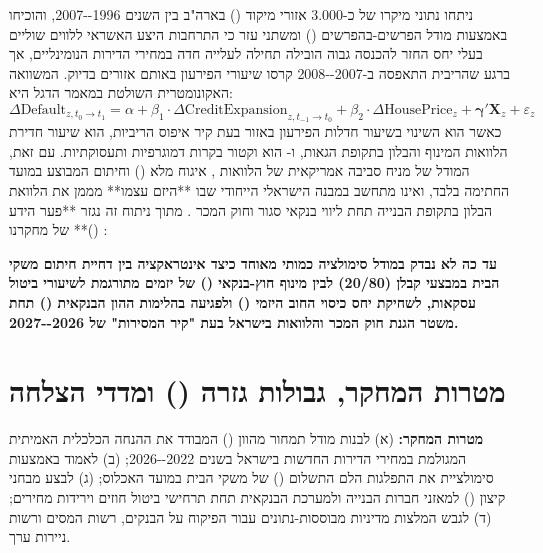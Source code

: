  ניתחו נתוני מיקרו של כ-\num{3,000} אזורי מיקוד () בארה"ב בין השנים \num{1996--2007}, והוכיחו באמצעות מודל הפרשים-בהפרשים () ומשתני עזר כי התרחבות היצע האשראי ללווים שוליים בעלי יחס החזר להכנסה גבוה הובילה תחילה לעלייה חדה במחירי הדירות הנומינליים, אך ברגע שהריבית התאפסה ב-\num{2007--2008} קרסו שיעורי הפירעון באותם אזורים בדיוק. המשוואה האקונומטרית השולטת במאמר הדגל היא:
\begin{equation}
\label{eq:mian_sufi_flagship}
\Delta \text{Default}_{z, t_0 \to t_1} = \alpha + \beta_1 \cdot \Delta \text{CreditExpansion}_{z, t_{-1} \to t_0} + \beta_2 \cdot \Delta \text{HousePrice}_{z} + \boldsymbol{\gamma}' \mathbf{X}_{z} + \varepsilon_{z}
\end{equation}
כאשר  הוא השינוי בשיעור חדלות הפירעון באזור  בעת קיר איפוס הריביות,  הוא שיעור חדירת הלוואות המינוף והבלון בתקופת הגאות, ו- הוא וקטור בקרות דמוגרפיות ותעסוקתיות. עם זאת, המודל של  מניח סביבה אמריקאית של הלוואות , איגוח מלא () וחיתום המבוצע במועד החתימה בלבד, ואינו מתחשב במבנה הישראלי הייחודי שבו **היזם עצמו** מממן את הלוואת הבלון בתקופת הבנייה תחת ליווי בנקאי סגור וחוק המכר \cite{salelaw1974}. מתוך ניתוח זה נגזר **פער הידע ()** של מחקרנו \cite{sandberg2011ways}:

\begin{modelbox}
\textbf{עד כה לא נבדק במודל סימולציה כמותי מאוחד כיצד אינטראקציה בין דחיית חיתום משקי הבית במבצעי קבלן (\num{20/80}) לבין מינוף חוץ-בנקאי () של יזמים מתורגמת לשיעורי ביטול עסקאות, לשחיקת יחס כיסוי החוב היזמי () ולפגיעה בהלימות ההון הבנקאית () תחת משטר הגנת חוק המכר והלוואות  בישראל בעת "קיר המסירות" של \num{2026--2027}.}
\end{modelbox}

\section{מטרות המחקר, גבולות גזרה () ומדדי הצלחה}
\label{sec:ch01_scope}

\textbf{מטרות המחקר:} (א) לבנות מודל תמחור מהוון () המבודד את ההנחה הכלכלית האמיתית המגולמת במחירי הדירות החדשות בישראל בשנים \num{2022--2026}; (ב) לאמוד באמצעות סימולציית  את התפלגות הלם התשלום () של משקי הבית במועד האכלוס; (ג) לבצע מבחני קיצון () למאזני חברות הבנייה ולמערכת הבנקאית תחת תרחישי ביטול חוזים וירידות מחירים; (ד) לגבש המלצות מדיניות מבוססות-נתונים עבור הפיקוח על הבנקים, רשות המסים ורשות ניירות ערך.

